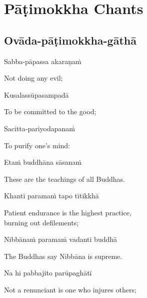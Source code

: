 \chapter{Pāṭimokkha Chants}

\section{Ovāda-pāṭimokkha-gāthā}


\begin{leader}
\end{leader}


Sabba-pāpassa akaraṇaṁ

\begin{cprenglish}
  Not doing any evil;
\end{cprenglish}

Kusalassūpasampadā

\begin{cprenglish}
  To be committed to the good;
\end{cprenglish}

Sacitta-pariyodapanaṁ

\begin{cprenglish}
  To purify one's mind:
\end{cprenglish}

Etaṁ buddhāna sāsanaṁ

\begin{cprenglish}
  These are the teachings of all Buddhas.
\end{cprenglish}

Khantī paramaṁ tapo tītikkhā

\begin{cprenglish}
  Patient endurance is the highest practice,\\
  burning out defilements;\\
\end{cprenglish}

Nibbānaṁ paramaṁ vadanti buddhā

\begin{cprenglish}
  The Buddhas say Nibbāna is supreme.
\end{cprenglish}

Na hi pabbajito parūpaghātī

\begin{cprenglish}
  Not a renunciant is one who injures others;
\end{cprenglish}


